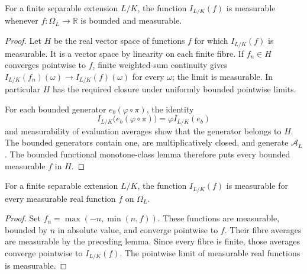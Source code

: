 \begin{lemma}
\label{lem:bounded-fibre-measurability}
\leanok
{}
For a finite separable extension $L/K$, the function $I_{L/K}(f)$ is
measurable whenever $f:\Omega_L\to\mathbb R$ is bounded and measurable.
\end{lemma}
\begin{proof}
Let $H$ be the real vector space of functions $f$ for which $I_{L/K}(f)$
is measurable. It is a vector space by linearity on each finite fibre.
If $f_n\in H$ converges pointwise to $f$, finite weighted-sum continuity
gives $I_{L/K}(f_n)(\omega)\to I_{L/K}(f)(\omega)$ for every $\omega$;
the limit is measurable. In particular $H$ has the required closure
under uniformly bounded pointwise limits.

For each bounded generator $e_b(\varphi\circ\pi)$, the identity
\[
 I_{L/K}\bigl(e_b(\varphi\circ\pi)\bigr)
   =\varphi I_{L/K}(e_b)
\]
and measurability of evaluation averages show that the generator
belongs to $H$. The bounded generators contain one, are multiplicatively
closed, and generate $\mathcal A_L$. The bounded functional
monotone-class lemma therefore puts every bounded measurable $f$ in $H$.
\end{proof}

\begin{corollary}
\label{cor:measurable-fibre-integral-by-truncation}
\leanok
{}
For a finite separable extension $L/K$, the function $I_{L/K}(f)$ is
measurable for every measurable real function $f$ on $\Omega_L$.
\end{corollary}
\begin{proof}
Set $f_n=\max(-n,\min(n,f))$. These functions are measurable, bounded
by $n$ in absolute value, and converge pointwise to $f$. Their fibre
averages are measurable by the preceding lemma. Since every fibre
is finite, those averages converge pointwise to $I_{L/K}(f)$.
The pointwise limit of measurable real functions is measurable.
\end{proof}

